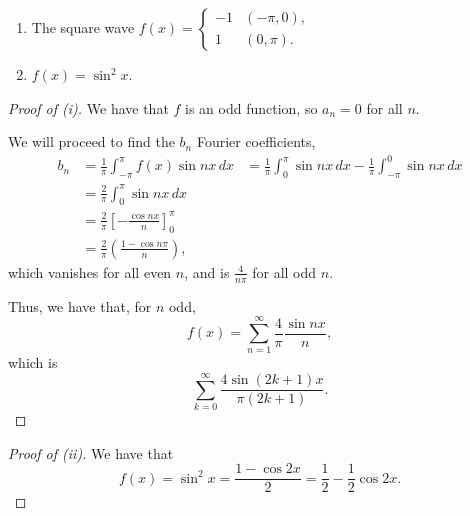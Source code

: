 \documentclass[../hw5]{subfiles}
\begin{document}
\begin{problem}
\begin{enumerate}
	\item The square wave $f(x)=\begin{cases}
			      -1 & (-\pi,0 ), \\ 1 & (0,\pi ).
		      \end{cases}$
	\item $f(x)=\sin^2{x}$.
\end{enumerate}
\end{problem}
\begin{proof}[Proof of (i)]
	We have that $f$ is an odd function, so  $a_n=0$ for all  $n$.

	We will proceed to find the $b_n$ Fourier coefficients,
	\begin{align*}
		b_n & = \frac{1}{\pi }\int_{-\pi }^{\pi }f(x)\sin{nx} \,dx
		    & = \frac{1}{\pi}\int_{0}^{\pi } \sin{nx} \,dx - \frac{1}{\pi }\int_{-\pi }^{0} \sin{nx}  \,dx \\
		    & = \frac{2}{\pi }\int_{0}^{\pi } \sin{nx}  \,dx                                               \\
		    & = \frac{2}{\pi }\left[ -\frac{\cos{nx} }{n} \right]^{\pi }_0                                 \\
		    & = \frac{2}{\pi }\left( \frac{1-\cos{n\pi } }{n} \right)
		,\end{align*}
	which vanishes for all even $n$, and is $\frac{4}{n\pi}$ for all odd $n$.

	Thus, we have that, for $n$ odd, \[
		f(x)=\sum_{n=1}^{\infty} \frac{4}{\pi }\frac{\sin{nx}}{n}
		,\] which is \[
		\sum_{k=0}^{\infty} \frac{4\sin{(2k+1)x}}{\pi(2k+1) }
		.\]
\end{proof}
\begin{proof}[Proof of (ii)]
	We have that \[
		f(x)=\sin^2{x}=\frac{1-\cos{2x} }{2}=\frac{1}{2}-\frac{1}{2}\cos{2x}
		.\]
\end{proof}
\end{document}
